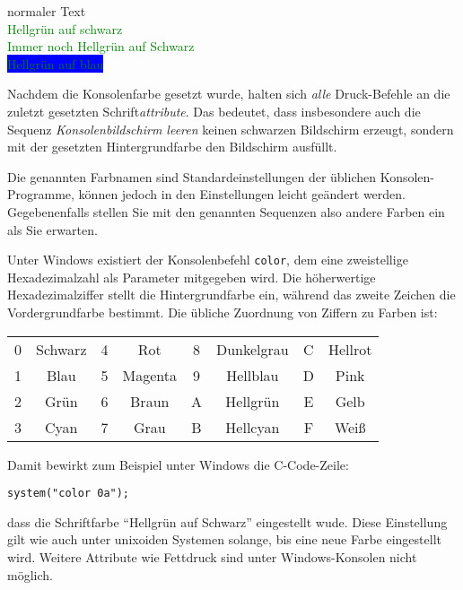 \begin{cmdbox}
normaler Text\\
\textcolor{green}{Hellgrün auf schwarz}\\
\textcolor{green}{Immer noch Hellgrün auf Schwarz}\\
\colorbox {blue} {\textcolor{green}{Hellgrün auf blau}}
\end{cmdbox}

Nachdem die Konsolenfarbe gesetzt wurde, halten sich \emph{alle} Druck-Befehle an die zuletzt gesetzten Schrift\emph{attribute}. Das bedeutet, dass insbesondere auch die Sequenz \emph{Konsolenbildschirm leeren} keinen schwarzen Bildschirm erzeugt, sondern mit der gesetzten Hintergrundfarbe den Bildschirm ausfüllt.

Die genannten Farbnamen sind Standardeinstellungen der üblichen Konsolen-Programme, können jedoch in den Einstellungen leicht geändert werden. Gegebenenfalls stellen Sie mit den genannten Sequenzen also andere Farben ein als Sie erwarten.

\begin{hintbox}
Unter Windows existiert der Konsolenbefehl \texttt{color}, dem eine zweistellige Hexadezimalzahl als Parameter mitgegeben wird. Die höherwertige Hexadezimalziffer stellt die Hintergrundfarbe ein, während das zweite Zeichen die Vordergrundfarbe bestimmt. Die übliche Zuordnung von Ziffern zu Farben ist:
\begin{center}
\begin{tabular}{cc|cc||cc|cc}
	0 & Schwarz	& 4 & Rot		&	8 & Dunkelgrau	& C & Hellrot \\
	1 & Blau		& 5 & Magenta	&	9 &	Hellblau		& D & Pink    \\
	2 & Grün		& 6 & Braun		&	A &	Hellgrün		& E & Gelb    \\
	3 & Cyan		& 7 & Grau		&	B & Hellcyan		& F & Weiß
\end{tabular}
\end{center}
Damit bewirkt zum Beispiel unter Windows die C-Code-Zeile:
\begin{center}
	\texttt{system("color 0a");}
\end{center}
dass die Schriftfarbe \enquote{Hellgrün auf Schwarz} eingestellt wude. Diese Einstellung gilt wie auch unter unixoiden Systemen solange, bis eine neue Farbe eingestellt wird. Weitere Attribute wie Fettdruck sind unter Windows-Konsolen nicht möglich.
\end{hintbox}